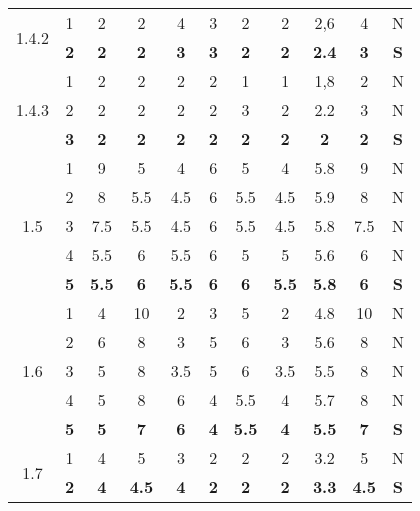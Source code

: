 \documentclass[11pt,a4paper,spanish,twoside]{report}
\begin{document}
\begin{table}[!h]
\begin{tabular}{|c|c||c|c|c|c|c||c|c|c||c|}
    \multirow{2}{*}{1.4.2} & 1 & 2 & 2 & 4 & 3 & 2 & 2 & 2,6 & 4 & N\\
    & \textbf{2} & \textbf{2} & \textbf{2} & \textbf{3} & \textbf{3} & \textbf{2} & \textbf{2} & \textbf{2.4} & \textbf{3} & \textbf{S} \\
    \hline

    \multirow{3}{*}{1.4.3} & 1 & 2 & 2 & 2 & 2 & 1 & 1 & 1,8 & 2 & N\\
    & 2 & 2 & 2 & 2 & 2 & 3 & 2 & 2.2 & 3 & N \\
    & \textbf{3} & \textbf{2} & \textbf{2} & \textbf{2} & \textbf{2} & \textbf{2} & \textbf{2} & \textbf{2} & \textbf{2} & \textbf{S} \\
    \hline

    \multirow{5}{*}{1.5} & 1 & 9 & 5 & 4 & 6 & 5 & 4 & 5.8 & 9 & N \\
    & 2 & 8 & 5.5 & 4.5 & 6 & 5.5 & 4.5 & 5.9 & 8 & N \\
    & 3 & 7.5 & 5.5 & 4.5 & 6 & 5.5 & 4.5 & 5.8 & 7.5 & N \\
    & 4 & 5.5 & 6 & 5.5 & 6 & 5 & 5 & 5.6 & 6 & N \\
    & \textbf{5} & \textbf{5.5} & \textbf{6} & \textbf{5.5} & \textbf{6} & \textbf{6} & \textbf{5.5} & \textbf{5.8} & \textbf{6} & \textbf{S} \\
    \hline

    \multirow{5}{*}{1.6} & 1 & 4 & 10 & 2 & 3 & 5 & 2 & 4.8 & 10 & N \\
    & 2 & 6 & 8 & 3 & 5 & 6 & 3 & 5.6 & 8 & N \\
    & 3 & 5 & 8 & 3.5 & 5 & 6 & 3.5 & 5.5 & 8 & N \\
    & 4 & 5 & 8 & 6 & 4 & 5.5 & 4 & 5.7 & 8 & N \\
    & \textbf{5} & \textbf{5} & \textbf{7} & \textbf{6} & \textbf{4} & \textbf{5.5} & \textbf{4} & \textbf{5.5} & \textbf{7} & \textbf{S} \\
    \hline

    \multirow{2}{*}{1.7} & 1 & 4 & 5 & 3 & 2 & 2 & 2 & 3.2 & 5 & N \\
    & \textbf{2} & \textbf{4} & \textbf{4.5} & \textbf{4} & \textbf{2} & \textbf{2} & \textbf{2} & \textbf{3.3} & \textbf{4.5} & \textbf{S} \\
    \hline


\end{tabular}
\end{table}
\end{document}
